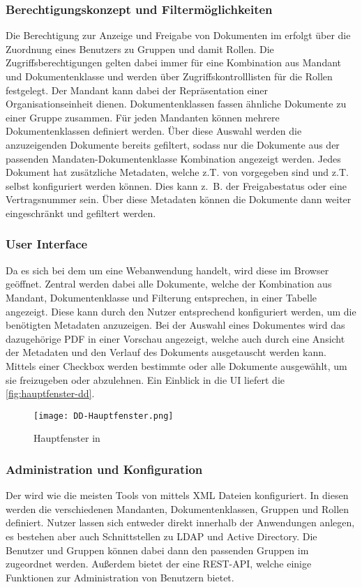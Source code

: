\subsubsection{Berechtigungskonzept und Filtermöglichkeiten}
Die Berechtigung zur Anzeige und Freigabe von Dokumenten im \docdesk{} erfolgt über die Zuordnung eines Benutzers zu Gruppen und damit Rollen.
Die Zugriffsberechtigungen gelten dabei immer für eine Kombination aus Mandant und Dokumentenklasse und werden über Zugriffskontrolllisten für die Rollen festgelegt.
Der Mandant kann dabei der Repräsentation einer Organisationseinheit dienen. Dokumentenklassen fassen ähnliche Dokumente zu einer Gruppe zusammen.
Für jeden Mandanten können mehrere Dokumentenklassen definiert werden.
Über diese Auswahl werden die anzuzeigenden Dokumente bereits gefiltert, sodass nur die Dokumente aus der passenden Mandaten-Dokumentenklasse Kombination angezeigt werden.
Jedes Dokument hat zusätzliche Metadaten, welche z.T. von \compart{} vorgegeben sind und z.T. selbst konfiguriert werden können.
Dies kann z.~B. der Freigabestatus oder eine Vertragsnummer sein.
Über diese Metadaten können die Dokumente dann weiter eingeschränkt und gefiltert werden.

\subsubsection{User Interface}
Da es sich bei dem \docdesk{} um eine Webanwendung handelt, wird diese im Browser geöffnet.
Zentral werden dabei alle Dokumente, welche der Kombination aus Mandant, Dokumentenklasse und Filterung entsprechen, in einer Tabelle angezeigt.
Diese kann durch den Nutzer entsprechend konfiguriert werden, um die benötigten Metadaten anzuzeigen.
Bei der Auswahl eines Dokumentes wird das dazugehörige PDF in einer Vorschau angezeigt,
welche auch durch eine Ansicht der Metadaten und den Verlauf des Dokuments ausgetauscht werden kann.
Mittels einer Checkbox werden bestimmte oder alle Dokumente ausgewählt, um sie freizugeben oder abzulehnen.
Ein Einblick in die UI liefert die \autoref{fig:hauptfenster-dd}.
\begin{figure}[htbp]
    \centering
    \texttt{[image: DD-Hauptfenster.png]}
    \caption{Hauptfenster in \docdesk{}}
    \label{fig:hauptfenster-dd}
\end{figure}

\subsubsection{Administration und Konfiguration}
Der \docdesk{} wird wie die meisten Tools von \compart{} mittels XML Dateien konfiguriert.
In diesen werden die verschiedenen Mandanten, Dokumentenklassen, Gruppen und Rollen definiert.
Nutzer lassen sich entweder direkt innerhalb der Anwendungen anlegen,
es bestehen aber auch Schnittstellen zu LDAP und Active Directory.
Die Benutzer und Gruppen können dabei dann den passenden Gruppen im \docdesk{} zugeordnet werden.
Außerdem bietet der \docdesk{} eine \acrshort{REST}-\acrshort{API}, welche einige Funktionen zur Administration von Benutzern bietet.

